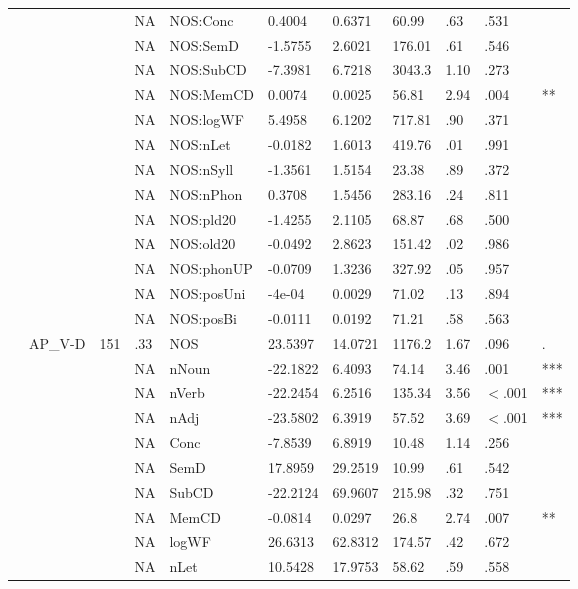 \begin{table}[ht]
\begin{tabular}{lllllllllll}
   &  &  & NA & NOS:Conc & 0.4004 & 0.6371 & 60.99 & .63 & .531 &   \\ 
   &  &  & NA & NOS:SemD & -1.5755 & 2.6021 & 176.01 & .61 & .546 &   \\ 
   &  &  & NA & NOS:SubCD & -7.3981 & 6.7218 & 3043.3 & 1.10 & .273 &   \\ 
   &  &  & NA & NOS:MemCD & 0.0074 & 0.0025 & 56.81 & 2.94 & .004 & ** \\ 
   &  &  & NA & NOS:logWF & 5.4958 & 6.1202 & 717.81 & .90 & .371 &   \\ 
   &  &  & NA & NOS:nLet & -0.0182 & 1.6013 & 419.76 & .01 & .991 &   \\ 
   &  &  & NA & NOS:nSyll & -1.3561 & 1.5154 & 23.38 & .89 & .372 &   \\ 
   &  &  & NA & NOS:nPhon & 0.3708 & 1.5456 & 283.16 & .24 & .811 &   \\ 
   &  &  & NA & NOS:pld20 & -1.4255 & 2.1105 & 68.87 & .68 & .500 &   \\ 
   &  &  & NA & NOS:old20 & -0.0492 & 2.8623 & 151.42 & .02 & .986 &   \\ 
   &  &  & NA & NOS:phonUP & -0.0709 & 1.3236 & 327.92 & .05 & .957 &   \\ 
   &  &  & NA & NOS:posUni & -4e-04 & 0.0029 & 71.02 & .13 & .894 &   \\ 
   &  &  & NA & NOS:posBi & -0.0111 & 0.0192 & 71.21 & .58 & .563 &   \\ 
   & AP\_V-D & 151 & .33 & NOS & 23.5397 & 14.0721 & 1176.2 & 1.67 & .096 & . \\ 
   &  &  & NA & nNoun & -22.1822 & 6.4093 & 74.14 & 3.46 & .001 & *** \\ 
   &  &  & NA & nVerb & -22.2454 & 6.2516 & 135.34 & 3.56 & $<$.001 & *** \\ 
   &  &  & NA & nAdj & -23.5802 & 6.3919 & 57.52 & 3.69 & $<$.001 & *** \\ 
   &  &  & NA & Conc & -7.8539 & 6.8919 & 10.48 & 1.14 & .256 &   \\ 
   &  &  & NA & SemD & 17.8959 & 29.2519 & 10.99 & .61 & .542 &   \\ 
   &  &  & NA & SubCD & -22.2124 & 69.9607 & 215.98 & .32 & .751 &   \\ 
   &  &  & NA & MemCD & -0.0814 & 0.0297 & 26.8 & 2.74 & .007 & ** \\ 
   &  &  & NA & logWF & 26.6313 & 62.8312 & 174.57 & .42 & .672 &   \\ 
   &  &  & NA & nLet & 10.5428 & 17.9753 & 58.62 & .59 & .558 &   \\ 

\end{tabular}
\end{table}
